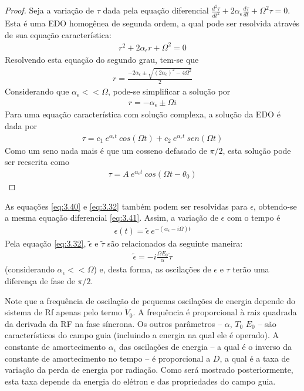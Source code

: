 \begin{proof}
	Seja a variação de $\tau$ dada pela equação diferencial $\frac{d^2 \tau}{dt^2} + 2\alpha_\epsilon \frac{d\tau}{dt} + \Omega^2 \tau = 0$. Esta é uma EDO homogênea de segunda ordem, a qual pode ser resolvida através de sua equação característica:
	\begin{align*}
		r^2 + 2\alpha_\epsilon r + \Omega^2 = 0
	\end{align*}
	Resolvendo esta equação do segundo grau, tem-se que
	\begin{align*}
		r = \frac{-2\alpha_\epsilon \pm \sqrt{(2\alpha_\epsilon)^2 - 4\Omega^2}}{2}
	\end{align*}
	Considerando que $\alpha_\epsilon << \Omega$, pode-se simplificar a solução por
	\begin{align*}
		r = -\alpha_\epsilon \pm \Omega i
	\end{align*}
	Para uma equação característica com solução complexa, a solução da EDO é dada por
	\begin{align*}
		\tau = c_1\ e^{\alpha_\epsilon t}\ cos(\Omega t) + c_2\ e^{\alpha_\epsilon t}\ sen(\Omega t)
	\end{align*}
	Como um seno nada mais é que um cosseno defasado de $\pi/2$, esta solução pode ser reescrita como
	\begin{align*}
		\tau = A\ e^{\alpha_\epsilon t}\ cos(\Omega t - \theta_0)
	\end{align*}
\end{proof}

As equações \eqref{eq:3.40} e \eqref{eq:3.32} também podem ser resolvidas para $\epsilon$, obtendo-se a mesma equação diferencial \eqref{eq:3.41}. Assim, a variação de $\epsilon$ com o tempo é
\begin{align}
	\epsilon(t) = \tilde{\epsilon}\ e^{-(\alpha_\epsilon - i\Omega)t}
\end{align}
Pela equação \eqref{eq:3.32}, $\tilde{\epsilon}$ e $\tilde{\tau}$ são relacionados da seguinte maneira:
\begin{align}
	\tilde{\epsilon} = -i\frac{\Omega E_0}{\alpha}\tilde{\tau}\label{eq:3.47}
\end{align}
(considerando $\alpha_\epsilon << \Omega$) e, desta forma, as oscilações de $\epsilon$ e $\tau$ terão uma diferença de fase de $\pi/2$.

Note que a frequência de oscilação de pequenas oscilações de energia depende do sistema de Rf apenas pelo termo $\dot{V}_0$. A frequência é proporcional à raiz quadrada da derivada da RF na fase síncrona. Os outros parâmetros -- $\alpha$, $T_0$ $E_0$ -- são característicos do campo guia (incluindo a energia na qual ele é operado). A constante de amortecimento $\alpha_\epsilon$ das oscilações de energia -- a qual é o inverso da constante de amortecimento no tempo -- é proporcional a $D$, a qual é a taxa de variação da perda de energia por radiação. Como será mostrado posteriormente, esta taxa depende da energia do elétron e das propriedades do campo guia.

